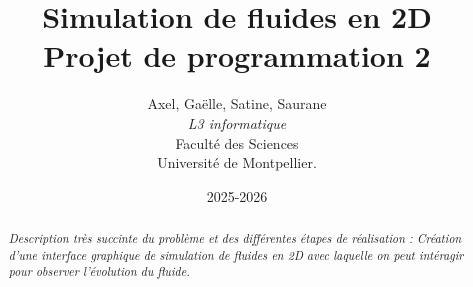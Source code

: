 \documentclass[a4paper]{article}
\title{  Simulation de fluides en 2D\\         %
  Projet de programmation 2}
\author{ Axel, Gaëlle, Satine, Saurane\\
  \emph{L3 informatique}\\
  Faculté des Sciences\\
Université de Montpellier.}
\date{2025-2026}
\begin{document}
\maketitle                    %


\begin{abstract}     %

  \emph{Description très succinte du problème et des différentes étapes de réalisation :
  Création d'une interface graphique de simulation de fluides en 2D 
  avec laquelle on peut intéragir pour observer l'évolution du fluide.}

\end{abstract}
\newpage
\tableofcontents
\newpage
\end{document}
